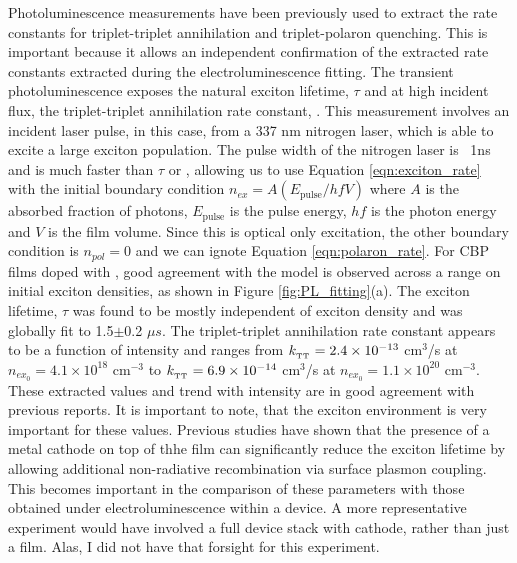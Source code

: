 \documentclass[../thesis.tex]{subfiles}
\begin{document}
Photoluminescence measurements have been previously used to extract the rate constants for triplet-triplet annihilation and triplet-polaron quenching.\cite{Erickson2014,Reineke2007}
This is important because it allows an independent confirmation of the extracted rate constants extracted during the electroluminescence fitting.
The transient photoluminescence exposes the natural exciton lifetime, $\tau$ and at high incident flux, the triplet-triplet annihilation rate constant, \ktt.
This measurement involves an incident laser pulse, in this case, from a 337 nm nitrogen laser, which is able to excite a large exciton population.
The pulse width of the nitrogen laser is ~1ns and is much faster than $\tau$ or \ktt, allowing us to use Equation \ref{eqn:exciton_rate} with the initial boundary condition $n_{ex}=A(E_{\text{pulse}}/hfV)$ where $A$ is the absorbed fraction of photons, $E_{\text{pulse}}$ is the pulse energy, $hf$ is the photon energy and $V$ is the film volume.
Since this is optical only excitation, the other boundary condition is $n_{pol}=0$ and we can ignote Equation \ref{eqn:polaron_rate}.\cite{Reineke2007,Erickson2014,Baldo2000a}
For CBP films doped with \irppy, good agreement with the model is observed across a range on initial exciton densities, as shown in Figure \ref{fig:PL_fitting}(a).
The exciton lifetime, $\tau$ was found to be mostly independent of exciton density and was globally fit to 1.5$\pm$0.2 $\mu s$.  
The triplet-triplet annihilation rate constant appears to be a function of intensity and ranges from $k_{_\text{\tiny TT}}=2.4\times10^{-13}$ cm$^3$/s at $n_{ex_0}=4.1\times10^{18}$ cm$^{-3}$ to $k_{_\text{\tiny TT}}=6.9\times10^{-14}$ cm$^3$/s at $n_{ex_0}=1.1\times10^{20}$ cm$^{-3}$.
These extracted values and trend with intensity are in good agreement with previous reports.\cite{Reineke2007,Erickson2014,Staroske2007}
It is important to note, that the exciton environment is very important for these values.  
Previous studies have shown that the presence of a metal cathode on top of thhe film can significantly reduce the exciton lifetime by allowing additional non-radiative recombination via surface plasmon coupling.\cite{Song2011}
This becomes important in the comparison of these parameters with those obtained under electroluminescence within a device.
A more representative experiment would have involved a full device stack with cathode, rather than just a film.  
Alas, I did not have that forsight for this experiment.
\end{document}
